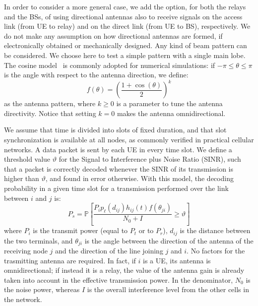 \documentclass[12pt, letterpaper, onecolumn, draftcls]{IEEEtran}
\begin{document}
In order to consider a more general case, we add the option, for both the relays and the BSs, of using directional antennas also to receive signals on the access link (from UE to relay) and on the direct link (from UE to BS), respectively. We do not make any assumption on how directional antennas are formed, if electronically obtained or mechanically designed.
Any kind of beam pattern can be considered. We choose here to test a simple pattern with a single main lobe. The cosine model~\cite{cosine} is commonly adopted for numerical simulations: if $-\pi\leq\theta\leq\pi$ is the angle with respect to the antenna direction, we define:
\begin{equation}
 f(\theta) = \left(\frac{1+\cos(\theta)}{2}\right)^k
\label{trigopattern}
\end{equation}
as the antenna pattern, where $k\geq 0$ is a parameter to tune the antenna directivity. Notice that setting $k=0$ makes the antenna omnidirectional.

We assume that time is divided into slots of fixed duration, and that slot synchronization is available at all nodes, as commonly verified in practical cellular networks. A data packet is sent by each UE in every time slot. We define a threshold value $\vartheta$ for the Signal to Interference plus Noise Ratio (SINR), such that a packet is correctly decoded whenever the SINR of its transmission is higher than $\vartheta$, and found in error otherwise. With this model, the decoding probability in a given time slot for a transmission performed over the link between $i$ and $j$ is:
\begin{equation}
 P_s = \mathbb{P}\left[\frac{P_ip_{\ell}(d_{ij})h_{ij}(t)f(\theta_{ji})}{N_0+I} \geq \vartheta\right]
\end{equation}
where $P_i$ is the transmit power (equal to $P_t$ or to $P_r$), $d_{ij}$ is the distance between the two terminals, and $\theta_{ji}$ is the angle between the direction of the antenna of the receiving node $j$ and the direction of the line joining $j$ and $i$. No factors for the trasmitting antenna are required. In fact, if $i$ is a UE, its antenna is omnidirectional; if instead it is a relay, the value of the antenna gain is already taken into account in the effective transmission power. In the denominator, $N_0$ is the noise power, whereas $I$ is the overall interference level from the other cells in the network.
\end{document}
